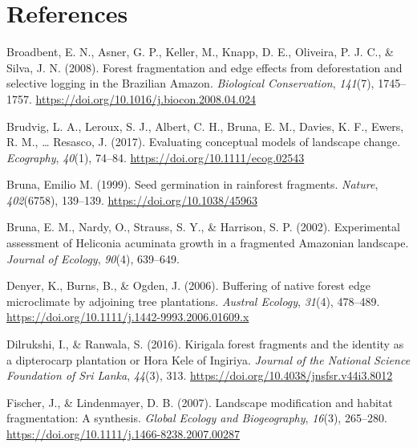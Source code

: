 \documentclass[
  man]{apa6}
\newlength{\cslhangindent}
\newenvironment{CSLReferences}[2] %
 {\begin{list}{}{%
  \setlength{\itemindent}{0pt}
  \setlength{\leftmargin}{0pt}
  \setlength{\parsep}{0pt}
  \ifodd #1
   \setlength{\leftmargin}{\cslhangindent}
   \setlength{\itemindent}{-1\cslhangindent}
  \fi
  \setlength{\itemsep}{#2\baselineskip}}}
 {\end{list}}
\begin{document}
\section*{References}\label{references}

\label{refs}
\begin{CSLReferences}{1}{0}
Broadbent, E. N., Asner, G. P., Keller, M., Knapp, D. E., Oliveira, P. J. C., \& Silva, J. N. (2008). Forest fragmentation and edge effects from deforestation and selective logging in the {Brazilian} {Amazon}. \emph{Biological Conservation}, \emph{141}(7), 1745--1757. \url{https://doi.org/10.1016/j.biocon.2008.04.024}

Brudvig, L. A., Leroux, S. J., Albert, C. H., Bruna, E. M., Davies, K. F., Ewers, R. M., \ldots{} Resasco, J. (2017). Evaluating conceptual models of landscape change. \emph{Ecography}, \emph{40}(1), 74--84. \url{https://doi.org/10.1111/ecog.02543}

Bruna, Emilio M. (1999). Seed germination in rainforest fragments. \emph{Nature}, \emph{402}(6758), 139--139. \url{https://doi.org/10.1038/45963}

Bruna, E. M., Nardy, O., Strauss, S. Y., \& Harrison, S. P. (2002). Experimental assessment of {Heliconia} acuminata growth in a fragmented {Amazonian} landscape. \emph{Journal of Ecology}, \emph{90}(4), 639--649.

Denyer, K., Burns, B., \& Ogden, J. (2006). Buffering of native forest edge microclimate by adjoining tree plantations. \emph{Austral Ecology}, \emph{31}(4), 478--489. \url{https://doi.org/10.1111/j.1442-9993.2006.01609.x}

Dilrukshi, I., \& Ranwala, S. (2016). Kirigala forest fragments and the identity as a dipterocarp plantation or {Hora} {Kele} of {Ingiriya}. \emph{Journal of the National Science Foundation of Sri Lanka}, \emph{44}(3), 313. \url{https://doi.org/10.4038/jnsfsr.v44i3.8012}

Fischer, J., \& Lindenmayer, D. B. (2007). Landscape modification and habitat fragmentation: A synthesis. \emph{Global Ecology and Biogeography}, \emph{16}(3), 265--280. \url{https://doi.org/10.1111/j.1466-8238.2007.00287}


\end{CSLReferences}
\end{document}
